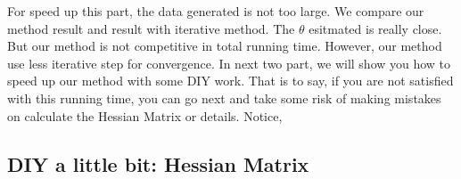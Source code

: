 \documentclass[
]{article}
\newenvironment{Shaded}{\begin{snugshade}}{\end{snugshade}}
\newcommand{\AttributeTok}[1]{\textcolor[rgb]{0.77,0.63,0.00}{#1}}
\newcommand{\CommentTok}[1]{\textcolor[rgb]{0.56,0.35,0.01}{\textit{#1}}}
\newcommand{\FunctionTok}[1]{\textcolor[rgb]{0.00,0.00,0.00}{#1}}
\newcommand{\NormalTok}[1]{#1}
\newcommand{\OtherTok}[1]{\textcolor[rgb]{0.56,0.35,0.01}{#1}}
\newcommand{\SpecialCharTok}[1]{\textcolor[rgb]{0.00,0.00,0.00}{#1}}
\newcommand{\StringTok}[1]{\textcolor[rgb]{0.31,0.60,0.02}{#1}}
\begin{document}
\begin{Shaded}
\end{Shaded}

For speed up this part, the data generated is not too large. We compare
our method result and result with iterative method. The \(\theta\)
esitmated is really close. But our method is not competitive in total
running time. However, our method use less iterative step for
convergence. In next two part, we will show you how to speed up our
method with some DIY work. That is to say, if you are not satisfied with
this running time, you can go next and take some risk of making mistakes
on calculate the Hessian Matrix or details. Notice,

\hypertarget{diy-a-little-bit-hessian-matrix}{%
\subsection{DIY a little bit: Hessian
Matrix}\label{diy-a-little-bit-hessian-matrix}}
\end{document}

